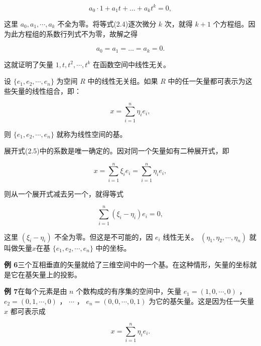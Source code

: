 \begin{equation*}
a _ {0} \cdot 1 + a _ {1} t + \dots + a _ {k} t ^ {k} = 0,\tag{2.4}
\end{equation*}

这里 $a_{0}, a_{1}, \cdots, a_{k}$ 不全为零。将等式(2.4)逐次微分 $k$ 次，就得 $k + 1$ 个方程组。因为此方程组的系数行列式不为零，故解之得

\begin{equation*}
a _ {0} = a _ {1} = \dots = a _ {k} = 0.
\end{equation*}

这就证明了矢量 $1, t, t^{2}, \cdots, t^{k}$ 在函数空间中线性无关。

设 $\{e_{1}, e_{2}, \cdots, e_{n}\}$ 为空间 $R$ 中的线性无关组。如果 $R$ 中的任一矢量都可表示为这些矢量的线性组合，即：

\begin{equation*}
x = \sum_ {i = 1} ^ {n} \eta_ {i} e _ {i},\tag{2.5}
\end{equation*}

则 $\{e_{1}, e_{2}, \cdots, e_{n}\}$ 就称为线性空间的基。

展开式(2.5)中的系数是唯一确定的。因对同一个矢量如有二种展开式，即

\begin{equation*}
x = \sum_ {i = 1} ^ {n} \xi_ {i} e _ {i} = \sum_ {i = 1} ^ {n} \eta_ {i} e _ {i},
\end{equation*}

则从一个展开式减去另一个，就得等式

\begin{equation*}
\sum_ {i = 1} ^ {n} \left(\xi_ {i} - \eta_ {i}\right) e _ {i} = 0,
\end{equation*}

这里 $(\xi_{i}-\eta_{i})$ 不全为零。但这是不可能的，因 $e_{i}$ 线性无关。 $(\eta_{1},\eta_{2},\cdots,\eta_{n})$ 就叫做矢量$x$在基 $\{e_{1},e_{2},\cdots,e_{n}\}$ 中的坐标。

\textbf{例 6}\quad 三个互相垂直的矢量就给了三维空间中的一个基。在这种情形，矢量的坐标就是它在基矢量上的投影。

\textbf{例 7}\quad 在每个元素是由 $n$ 个数构成的有序集的空间中，矢量 $e_{1}=(1,0,\cdots,0)$ ， $e_{2}=(0,1,\cdots,0)$ ， $\cdots$ ， $e_{n}=(0,0,\cdots,0,1)$ 为它的基矢量。这是因为任一矢量 $x$ 都可表示成

\begin{equation*}
x = \sum_ {i = 1} ^ {n} \eta_ {i} e _ {i}.
\end{equation*}

